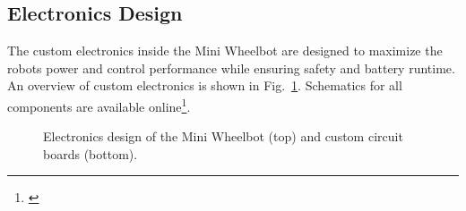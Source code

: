 \subsection{Electronics Design}
The custom electronics inside the Mini Wheelbot are designed to maximize the robots power and control performance while ensuring safety and battery runtime.
An overview of custom electronics is shown in Fig.~\ref{fig:electronicsschematic}.
Schematics for all components are available online\footnote{\label{footnote:code}\codelink}.

\begin{figure}[b]
    \centering
    \begin{subfigure}[b]{3.4in}
        \centering
        
    \end{subfigure}
    \par\medskip %
    \begin{subfigure}[b]{3.4in}
        \centering
        \newcommand{\photoheight}{0.64in}
    \end{subfigure}
    \caption{Electronics design of the Mini Wheelbot (top) and custom circuit boards (bottom).}
    \label{fig:electronicsschematic}
\end{figure}

